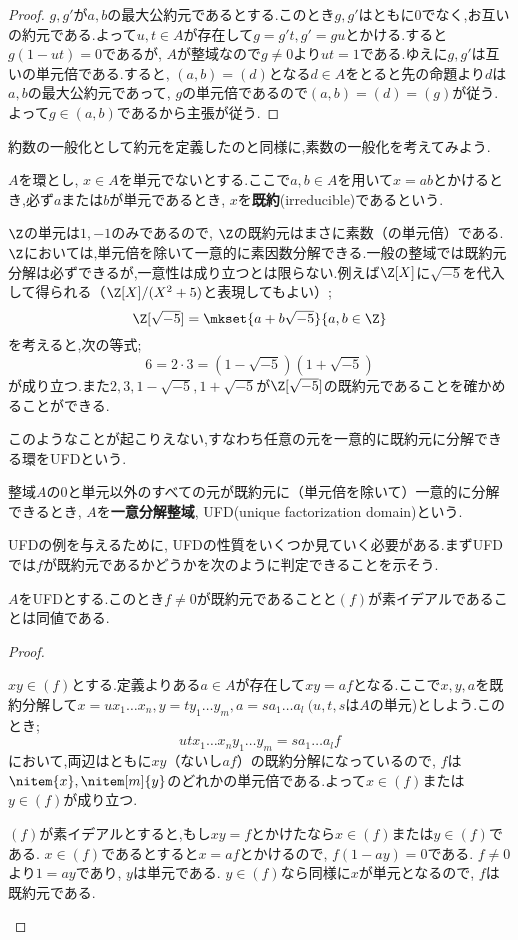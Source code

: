 \begin{proof}
	$g,g'$が$a,b$の最大公約元であるとする.このとき$g,g'$はともに0でなく,お互いの約元である.よって$u,t\in A$が存在して$g=g't,g'=gu$とかける.すると$g(1-ut)=0$であるが, $A$が整域なので$g\neq0$より$ut=1$である.ゆえに$g,g'$は互いの単元倍である.すると, $(a,b)=(d)$となる$d\in A$をとると先の命題より$d$は$a,b$の最大公約元であって, $g$の単元倍であるので$(a,b)=(d)=(g)$が従う.よって$g\in (a,b)$であるから主張が従う.
\end{proof}

約数の一般化として約元を定義したのと同様に,素数の一般化を考えてみよう.

\begin{defi}[既約元]\label{defi:既約元}
	$A$を環とし, $x\in A$を単元でないとする.ここで$a,b\in A$を用いて$x=ab$とかけるとき,必ず$a$または$b$が単元であるとき, $x$を\textbf{既約}(irreducible)であるという.
\end{defi}

$\Z$の単元は$1,-1$のみであるので, $\Z$の既約元はまさに素数（の単元倍）である. $\Z$においては,単元倍を除いて一意的に素因数分解できる.一般の整域では既約元分解は必ずできるが,一意性は成り立つとは限らない.例えば$\Z[X]$に$\sqrt{-5}$を代入して得られる（$\Z[X]/(X^2+5)$と表現してもよい）;
\[\Z[\sqrt{-5}]=\mkset{a+b\sqrt{-5}}{a,b\in\Z}\]
を考えると,次の等式;
\[6=2\cdot 3=(1-\sqrt{-5})(1+\sqrt{-5})\]
が成り立つ.また$2,3,1-\sqrt{-5},1+\sqrt{-5}$が$\Z[\sqrt{-5}]$の既約元であることを確かめることができる.

このようなことが起こりえない,すなわち任意の元を一意的に既約元に分解できる環をUFDという.

\begin{defi}[UFD]
	整域$A$の$0$と単元以外のすべての元が既約元に（単元倍を除いて）一意的に分解できるとき, $A$を\textbf{一意分解整域}, UFD(unique factorization domain)という.
\end{defi}

UFDの例を与えるために, UFDの性質をいくつか見ていく必要がある.まずUFDでは$f$が既約元であるかどうかを次のように判定できることを示そう.
\begin{prop}
	$A$をUFDとする.このとき$f\neq0$が既約元であることと$(f)$が素イデアルであることは同値である.
\end{prop}
\begin{proof}
	\begin{eqv}
		\item $xy\in(f)$とする.定義よりある$a\in A$が存在して$xy=af$となる.ここで$x,y,a$を既約分解して$x=ux_1\dots x_n,y=ty_1\dots y_m,a=sa_1\dots a_l~(u,t,s$は$A$の単元)としよう.このとき;
		\[utx_1\dots x_ny_1\dots y_m=sa_1\dots a_lf\]
		において,両辺はともに$xy$（ないし$af$）の既約分解になっているので, $f$は$\nitem{x},\nitem[m]{y}$のどれかの単元倍である.よって$x\in(f)$または$y\in(f)$が成り立つ.
		
		\item $(f)$が素イデアルとすると,もし$xy=f$とかけたなら$x\in (f)$または$y\in(f)$である. $x\in (f)$であるとすると$x=af$とかけるので, $f(1-ay)=0$である. $f\neq0$より$1=ay$であり, $y$は単元である. $y\in (f)$なら同様に$x$が単元となるので, $f$は既約元である.
	\end{eqv}
\end{proof}

